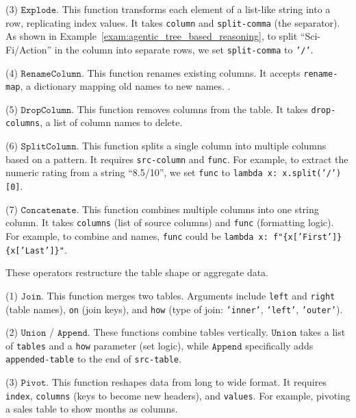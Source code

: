 (3) $\mathtt{Explode}$.
    This function transforms each element of a list-like string into a row, replicating index values. It takes {\small\texttt{column}} and {\small\texttt{split-comma}} (the separator). As shown in Example~\ref{exam:agentic_tree_based_reasoning}, to split ``Sci-Fi/Action'' in the  column into separate rows, we set {\small\texttt{split-comma}} to {\small\texttt{'/'}}.

(4) $\mathtt{RenameColumn}$.
    This function renames existing columns. It accepts {\small\texttt{rename-map}}, a dictionary mapping old names to new names. .

(5) $\mathtt{DropColumn}$.
    This function removes columns from the table. It takes {\small\texttt{drop-columns}}, a list of column names to delete.

(6) $\mathtt{SplitColumn}$.
    This function splits a single column into multiple columns based on a pattern. It requires {\small\texttt{src-column}} and {\small\texttt{func}}. For example, to extract the numeric rating from a string ``8.5/10'', we set {\small\texttt{func}} to {\small\texttt{lambda x: x.split('/')[0]}}.

(7) $\mathtt{Concatenate}$.
    This function combines multiple columns into one string column. It takes {\small\texttt{columns}} (list of source columns) and {\small\texttt{func}} (formatting logic). For example, to combine  and  names, {\small\texttt{func}} could be {\small\texttt{lambda x: f"\{x['First']\} \{x['Last']\}"}}.

These operators restructure the table shape or aggregate data.

(1) $\mathtt{Join}$.
    This function merges two tables. Arguments include {\small\texttt{left}} and {\small\texttt{right}} (table names), {\small\texttt{on}} (join keys), and {\small\texttt{how}} (type of join: {\small\texttt{'inner'}}, {\small\texttt{'left'}}, {\small\texttt{'outer'}}).

(2) $\mathtt{Union}$ / $\mathtt{Append}$.
    These functions combine tables vertically. $\mathtt{Union}$ takes a list of {\small\texttt{tables}} and a {\small\texttt{how}} parameter (\eg set logic), while $\mathtt{Append}$ specifically adds {\small\texttt{appended-table}} to the end of {\small\texttt{src-table}}.

(3) $\mathtt{Pivot}$.
    This function reshapes data from long to wide format. It requires {\small\texttt{index}}, {\small\texttt{columns}} (keys to become new headers), and {\small\texttt{values}}. For example, pivoting a sales table to show months as columns.

